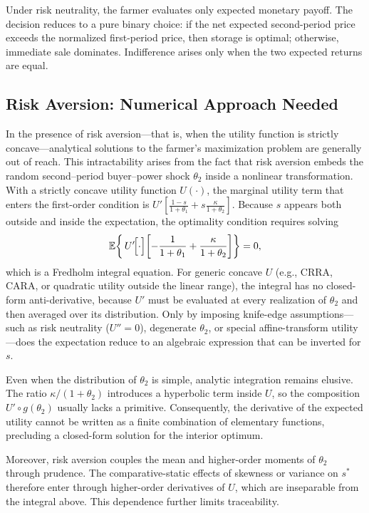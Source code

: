\noindent Under risk neutrality, the farmer evaluates only expected monetary payoff. The decision reduces to a pure binary choice: if the net expected second-period price exceeds the normalized first-period price, then storage is optimal; otherwise, immediate sale dominates. Indifference arises only when the two expected returns are equal.


\subsection{Risk Aversion: Numerical Approach Needed}
\noindent In the presence of risk aversion—that is, when the utility function is strictly concave—analytical solutions to the farmer’s maximization problem are generally out of reach. This intractability arises from the fact that risk aversion embeds the random second--period buyer–power shock $\theta_2$ inside a nonlinear transformation.  With a strictly concave utility function $U(\cdot)$, the marginal utility term that enters the first-order condition is $U'\!\left[\frac{1-s}{1+\theta_1}+ s\frac{\kappa}{1+\theta_2}\right]$.  Because $s$ appears both outside and inside the expectation, the optimality condition requires solving
$$
\mathbb{E}\!\left\{\,U'\!\Bigl[\cdot\Bigr]\!\left[-\frac{1}{1+\theta_1}+\frac{\kappa}{1+\theta_2}\right]\right\}=0,
$$
which is a Fredholm integral equation. For generic concave $U$ (e.g., CRRA, CARA, or quadratic utility outside the linear range), the integral has no closed-form anti-derivative, because $U'$ must be evaluated at every realization of $\theta_2$ and then averaged over its distribution. Only by imposing knife-edge assumptions—such as risk neutrality ($U''=0$), degenerate $\theta_2$, or special affine-transform utility—does the expectation reduce to an algebraic expression that can be inverted for $s$.

Even when the distribution of $\theta_2$ is simple, analytic integration remains elusive. The ratio $\kappa/(1+\theta_2)$ introduces a hyperbolic term inside $U$, so the composition $U'\circ g(\theta_2)$ usually lacks a primitive.  Consequently, the derivative of the expected utility cannot be written as a finite combination of elementary functions, precluding a closed-form solution for the interior optimum. 

Moreover, risk aversion couples the mean and higher-order moments of $\theta_2$ through prudence.  The comparative-static effects of skewness or variance on $s^{*}$ therefore enter through higher-order derivatives of $U$, which are inseparable from the integral above.  This dependence further limits traceability.


